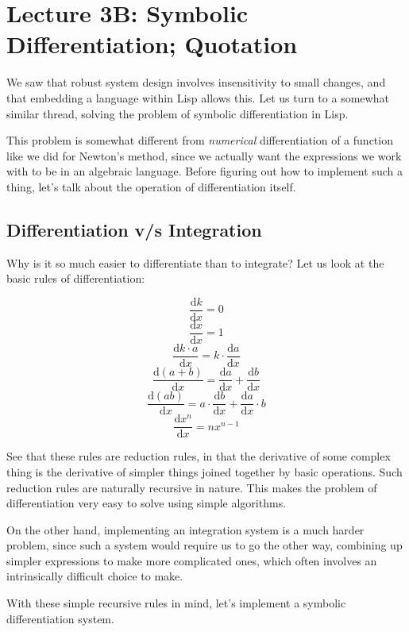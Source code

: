 \documentclass[9pt]{report}
\begin{document}
\chapter{Lecture 3B: Symbolic Differentiation; Quotation}
\label{sec:org6236d45}

We saw that robust system design involves insensitivity to small
changes, and that embedding a language within Lisp allows this. Let
us turn to a somewhat similar thread, solving the problem of
symbolic differentiation in Lisp.

This problem is somewhat different from \emph{numerical} differentiation
of a function like we did for Newton's method, since we actually
want the expressions we work with to be in an algebraic language.
Before figuring out how to implement such a thing, let's talk about
the operation of differentiation itself.

\section{Differentiation v/s Integration}
\label{sec:org5dc2a14}

Why is it so much easier to differentiate than to integrate?
Let us look at the basic rules of differentiation:

$$\frac{\mathrm{d}k}{\mathrm{d}x} = 0$$
$$\frac{\mathrm{d}x}{\mathrm{d}x} = 1$$
$$\frac{\mathrm{d}k\cdot a}{\mathrm{d}x} = k\cdot \frac{\mathrm{d}a}{\mathrm{d}x}$$
$$\frac{\mathrm{d}(a+b)}{\mathrm{d}x} =
   \frac{\mathrm{d}a}{\mathrm{d}x} + \frac{\mathrm{d}b}{\mathrm{d}x}$$
$$\frac{\mathrm{d}(ab)}{\mathrm{d}x} =  a\cdot
   \frac{\mathrm{d}b}{\mathrm{d}x} +
   \frac{\mathrm{d}a}{\mathrm{d}x}\cdot b$$
$$\frac{\mathrm{d}x^{n}}{\mathrm{d}x} = nx^{n-1}$$

See that these rules are reduction rules, in that the derivative of
some complex thing is the derivative of simpler things joined
together by basic operations. Such reduction rules are naturally
recursive in nature. This makes the problem of differentiation very
easy to solve using simple algorithms.

On the other hand, implementing an integration system is a much
harder problem, since such a system would require us to go the
other way, combining up simpler expressions to make more
complicated ones, which often involves an intrinsically difficult
choice to make.

With these simple recursive rules in mind, let's implement a
symbolic differentiation system.
\end{document}
